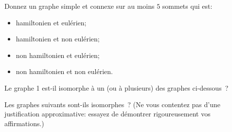 \begin{exo}
Donnez un graphe simple et connexe sur au moins $5$ sommets qui est:
\begin{itemize}
\item hamiltonien et eul\'erien;
\item hamiltonien et non eul\'erien;
\item non hamiltonien et eul\'erien;
\item non hamiltonien et non eul\'erien.
\end{itemize}
\end{exo}

\begin{exo}
Le graphe 1 est-il isomorphe \`a un (ou \`a plusieurs) des graphes ci-dessous~?
\end{exo}

\begin{figure}[!h]
\centering
\scalebox{.825}{}
\caption{}
\end{figure}

\begin{figure}[!h]
\scalebox{.825}{}
\caption{}
\end{figure}

\newpage
\begin{exo}
Les graphes suivants sont-ils isomorphes~? (Ne vous contentez pas d'une justification approximative: essayez de d\'emontrer rigoureusement vos affirmations.)
\end{exo}

\begin{figure}[!h]
\centering

\caption{}
\end{figure}%

\begin{figure}[!h]
\centering

\caption{}
\end{figure}

\begin{figure}[!h]
\centering

\caption{}
\end{figure}
